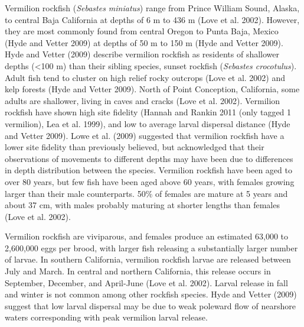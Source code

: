 \documentclass[11pt,
  english,
  a4paper,
]{article}
\begin{document}
Vermilion rockfish (\emph{Sebastes miniatus}) range from Prince William Sound, Alaska, to central Baja California at depths of 6 m to 436 m {(Love et al. 2002)\leavevmode\tagmcend\tagstructend}. However, they are most commonly found from central Oregon to Punta Baja, Mexico {(Hyde and Vetter 2009)\leavevmode\tagmcend\tagstructend} at depths of 50 m to 150 m {(Hyde and Vetter 2009)\leavevmode\tagmcend\tagstructend}. Hyde and Vetter {(2009)\leavevmode\tagmcend\tagstructend} describe vermilion rockfish as residents of shallower depths (\textless100 m) than their sibling species, sunset rockfish (\emph{Sebastes crocotulus}). Adult fish tend to cluster on high relief rocky outcrops {(Love et al. 2002)\leavevmode\tagmcend\tagstructend} and kelp forests {(Hyde and Vetter 2009)\leavevmode\tagmcend\tagstructend}. North of Point Conception, California, some adults are shallower, living in caves and cracks {(Love et al. 2002)\leavevmode\tagmcend\tagstructend}. Vermilion rockfish have shown high site fidelity {(Hannah and Rankin 2011 (only tagged 1 vermilion), Lea et al. 1999)\leavevmode\tagmcend\tagstructend}, and low to average larval dispersal distance {(Hyde and Vetter 2009)\leavevmode\tagmcend\tagstructend}. Lowe et al. {(2009)\leavevmode\tagmcend\tagstructend} suggested that vermilion rockfish have a lower site fidelity than previously believed, but acknowledged that their observations of movements to different depths may have been due to differences in depth distribution between the species. Vermilion rockfish have been aged to over 80 years, but few fish have been aged above 60 years, with females growing larger than their male counterparts. 50\% of females are mature at 5 years and about 37 cm, with males probably maturing at shorter lengths than females {(Love et al. 2002)\leavevmode\tagmcend\tagstructend}.

Vermilion rockfish are viviparous, and females produce an estimated 63,000 to 2,600,000 eggs per brood, with larger fish releasing a substantially larger number of larvae. In southern California, vermilion rockfish larvae are released between July and March. In central and northern California, this release occurs in September, December, and April-June {(Love et al. 2002)\leavevmode\tagmcend\tagstructend}. Larval release in fall and winter is not common among other rockfish species. Hyde and Vetter {(2009)\leavevmode\tagmcend\tagstructend} suggest that low larval dispersal may be due to weak poleward flow of nearshore waters corresponding with peak vermilion larval release.
\end{document}
